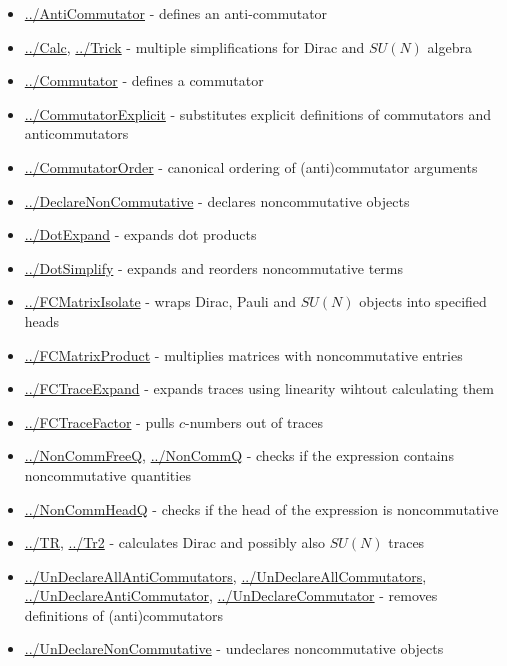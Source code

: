 \documentclass[../FeynCalcManual.tex]{subfiles}
\begin{document}
\begin{itemize}
\tightlist
\item
  \hyperlink{../anticommutator}{../AntiCommutator} - defines an
  anti-commutator
\item
  \hyperlink{../calc}{../Calc}, \hyperlink{../trick}{../Trick} -
  multiple simplifications for Dirac and \(SU(N)\) algebra
\item
  \hyperlink{../commutator}{../Commutator} - defines a commutator
\item
  \hyperlink{../commutatorexplicit}{../CommutatorExplicit} - substitutes
  explicit definitions of commutators and anticommutators
\item
  \hyperlink{../commutatororder}{../CommutatorOrder} - canonical
  ordering of (anti)commutator arguments
\item
  \hyperlink{../declarenoncommutative}{../DeclareNonCommutative} -
  declares noncommutative objects
\item
  \hyperlink{../dotexpand}{../DotExpand} - expands dot products
\item
  \hyperlink{../dotsimplify}{../DotSimplify} - expands and reorders
  noncommutative terms
\item
  \hyperlink{../fcmatrixisolate}{../FCMatrixIsolate} - wraps Dirac,
  Pauli and \(SU(N)\) objects into specified heads
\item
  \hyperlink{../fcmatrixproduct}{../FCMatrixProduct} - multiplies
  matrices with noncommutative entries
\item
  \hyperlink{../fctraceexpand}{../FCTraceExpand} - expands traces using
  linearity wihtout calculating them
\item
  \hyperlink{../fctracefactor}{../FCTraceFactor} - pulls \(c\)-numbers
  out of traces
\item
  \hyperlink{../noncommfreeq}{../NonCommFreeQ},
  \hyperlink{../noncommq}{../NonCommQ} - checks if the expression
  contains noncommutative quantities
\item
  \hyperlink{../noncommheadq}{../NonCommHeadQ} - checks if the head of
  the expression is noncommutative
\item
  \hyperlink{../tr}{../TR}, \hyperlink{../tr2}{../Tr2} - calculates
  Dirac and possibly also \(SU(N)\) traces
\item
  \hyperlink{../undeclareallanticommutators}{../UnDeclareAllAntiCommutators},
  \hyperlink{../undeclareallcommutators}{../UnDeclareAllCommutators},
  \hyperlink{../undeclareanticommutator}{../UnDeclareAntiCommutator},
  \hyperlink{../undeclarecommutator}{../UnDeclareCommutator} - removes
  definitions of (anti)commutators
\item
  \hyperlink{../undeclarenoncommutative}{../UnDeclareNonCommutative} -
  undeclares noncommutative objects
\end{itemize}
\end{document}
